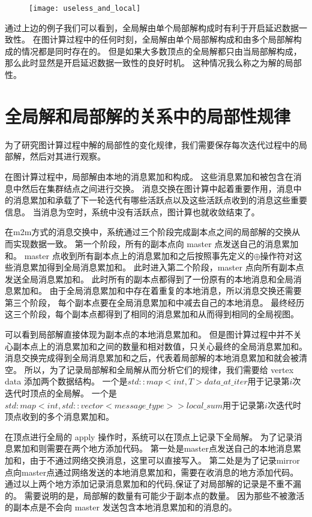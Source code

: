 \begin{figure}[!htbp]
\centering
\texttt{[image: useless\_and\_local]}
\label{fig:useless_and_local}
\end{figure}


通过上边的例子我们可以看到，全局解由单个局部解构成时有利于开启延迟数据一致性。
在图计算过程中的任何时刻，全局解由单个局部解构成和由多个局部解构成的情况都是同时存在的。
但是如果大多数顶点的全局解都只由当局部解构成，那么此时显然是开启延迟数据一致性的良好时机。
这种情况我么称之为解的局部性。

\section{全局解和局部解的关系中的局部性规律}
为了研究图计算过程中解的局部性的变化规律，我们需要保存每次迭代过程中的局部解，然后对其进行观察。

在图计算过程中，局部解由本地的消息累加和构成。
这些消息累加和被包含在消息中然后在集群结点之间进行交换。
消息交换在图计算中起着重要作用，消息中的消息累加和承载了下一轮迭代有哪些活跃点以及这些活跃点收到的消息这些重要信息。
当消息为空时，系统中没有活跃点，图计算也就收敛结束了。

在m2m方式的消息交换中，系统通过三个阶段完成副本点之间的局部解的交换从而实现数据一致。
第一个阶段，所有的副本点向 master 点发送自己的消息累加和。
master 点收到所有副本点上的消息累加和之后按照事先定义的$\oplus$操作符对这些消息累加得到全局消息累加和。
此时进入第二个阶段，master 点向所有副本点发送全局消息累加和。
此时所有的副本点都得到了一份原有的本地消息和全局消息累加和。
由于全局消息累加和中存在着重复的本地消息，所以消息交换还需要第三个阶段，
每个副本点要在全局消息累加和中减去自己的本地消息。
最终经历这三个阶段，每个副本点都得到了相同的消息累加和从而得到相同的全局视图。


可以看到局部解直接体现为副本点的本地消息累加和。
但是图计算过程中并不关心副本点上的消息累加和之间的数量和相对数值，只关心最终的全局消息累加和。
消息交换完成得到全局消息累加和之后，代表着局部解的本地消息累加和就会被清空。
所以，为了记录局部解和全局解从而分析它们的规律，我们需要给 vertex data 添加两个数据结构。
一个是$std::map<int,T> data\_at\_iter$用于记录第$i$次迭代时顶点的全局解。
一个是$std:map<int, std::vector<message\_type>> local\_sum$用于记录第$i$次迭代时
顶点收到的多个消息累加和。

在顶点进行全局的 apply 操作时，系统可以在顶点上记录下全局解。
为了记录消息累加和则需要在两个地方添加代码。
第一处是master点发送自己的本地消息累加和，由于不通过网络交换消息，这里可以直接写入。
第二处是为了记录mirror点向master点通过网络发送的本地消息累加和，需要在收消息的地方添加代码。
通过以上两个地方添加记录消息累加和的代码,保证了对局部解的记录是不重不漏的。 
需要说明的是，局部解的数量有可能少于副本点的数量。
因为那些不被激活的副本点是不会向 master 发送包含本地消息累加和的消息的。


